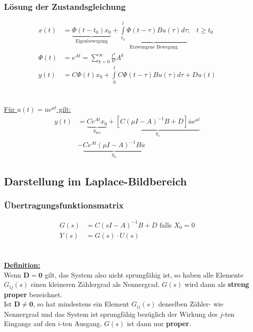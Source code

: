 \documentclass[a4paper,twocolumn,10pt]{article}
\begin{document}
\subsubsection{Lösung der Zustandsgleichung}
\begin{equation*}
\begin{split}
x(t)&=\underbrace{\Phi(t-t_0)x_0}_{\text{Eigenbewegung}}+\underbrace{\int\limits_{t_0}^t\Phi(t-\tau)Bu(\tau)d\tau}_{\text{Erzwungene Bewegung}};\;\;\;t\geq t_0\\
\Phi(t)&=e^{At}=\sum\limits_{k=0}^{\infty}\frac{t^k}{k!}A^k\\
y(t)&=C\Phi(t)x_0+\int\limits_{0}^tC\Phi(t-\tau)Bu(\tau)d\tau+Du(t)
\end{split}
\end{equation*}\\\\
\underline{Für $u(t)=\overline{u}e^{\mu t}$ gilt:}
\begin{equation*}
\begin{split}
y(t)&=\underbrace{Ce^{At}x_0}_{y_{\text{frei}}}+\underbrace{\left[C(\mu I-A)^{-1}B+D\right]\overline{u}e^{\mu t}}_{y_s}\\
&-\underbrace{Ce^{At}(\mu I-A)^{-1}B\overline{u}}_{y_{\text{ü}}}
\end{split}
\end{equation*}

\subsection{Darstellung im Laplace-Bildbereich}
\subsubsection{Übertragungsfunktionsmatrix}
\begin{equation*}
\begin{split}
G(s)&=C(sI-A)^{-1}B+D\text{ falls }X_0=0\\
Y(s)&=G(s)\cdot U(s)
\end{split}
\end{equation*}\\\\
\underline{\textbf{Definition:}}\\
Wenn $\mathbf{D=0}$ gilt, das System also nicht sprungfähig ist, so haben alle Elemente $G_{ij}(s)$ einen kleineren Zählergrad als Nennergrad. $G(s)$ wird dann als \textbf{streng proper} bezeichnet.\\
Ist $\mathbf{D\neq 0}$, so hat mindestens ein Element $G_{ij}(s)$ denselben Zähler- wie Nennergrad und das System ist sprungfähig bezüglich der Wirkung des $j$-ten Eingangs auf den $i$-ten Ausgang. $G(s)$ ist dann nur \textbf{proper}.
\end{document}
